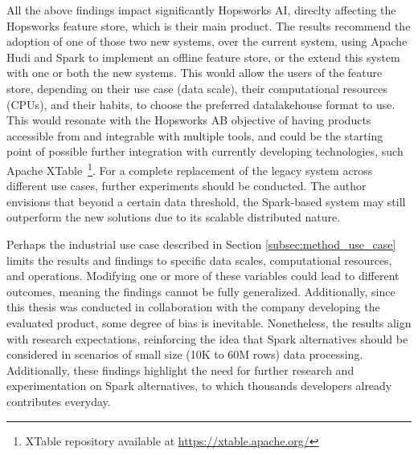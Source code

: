 All the above findings impact significantly Hopsworks AI, direclty affecting the Hopsworks feature store, which is their main product. The results recommend the adoption of one of those two new systems, over the current system, using Apache Hudi and Spark to implement an offline feature store, or the extend this system with one or both the new systems. This would allow the users of the feature store, depending on their use case (data scale), their computational resources (\glspl{CPU}), and their habits, to choose the preferred datalakehouse format to use. This would resonate with the Hopsworks AB objective of having products accessible from and integrable with multiple tools, and could be the starting point of possible further integration with currently developing technologies, such Apache XTable~\footnote{XTable repository available at \url{https://xtable.apache.org/}}. For a complete replacement of the legacy system across different use cases, further experiments should be conducted. The author envisions that beyond a certain data threshold, the Spark-based system may still outperform the new solutions due to its scalable distributed nature.

Perhaps the industrial use case described in Section \ref{subsec:method_use_case} limits the results and findings to specific data scales, computational resources, and operations. Modifying one or more of these variables could lead to different outcomes, meaning the findings cannot be fully generalized. Additionally, since this thesis was conducted in collaboration with the company developing the evaluated product, some degree of bias is inevitable. Nonetheless, the results align with research expectations, reinforcing the idea that Spark alternatives should be considered in scenarios of small size (10K to 60M rows) data processing. Additionally, these findings highlight the need for further research and experimentation on Spark alternatives, to which thousands developers already contributes everyday.



